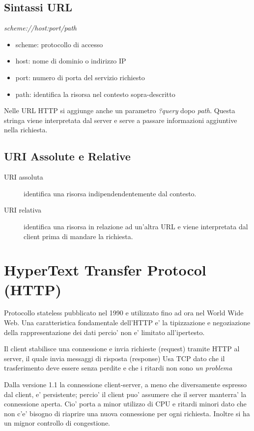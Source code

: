 \subsection{Sintassi URL}
\begin{center}
    \color{blue}\textit{scheme://host:port/path}
\end{center}
\begin{itemize}
    \item scheme: protocollo di accesso
    \item host: nome di dominio o indirizzo IP
    \item port: numero di porta del servizio richiesto
    \item path: identifica la risorsa nel contesto sopra-descritto
\end{itemize}
Nelle URL HTTP si aggiunge anche un parametro \textit{\color{blue}?query} dopo \textit{\color{blue}path}.
Questa stringa viene interpretata dal server e serve a passare informazioni aggiuntive nella richiesta.
\subsection{URI Assolute e Relative}
\begin{description}
    \item[URI assoluta] identifica una risorsa indipendendentemente dal contesto.
    \item[URI relativa] identifica una risorsa in relazione ad un'altra URL e viene interpretata dal client prima di mandare la richiesta. 
\end{description}
\section{HyperText Transfer Protocol (HTTP)}
Protocollo {\color{blue} stateless} pubblicato nel 1990 e utilizzato fino ad ora nel World Wide Web.
Una caratteristica fondamentale dell'HTTP e' la tipizzazione e negoziazione della rappresentazione dei dati percio' non e' limitato all'ipertesto.

Il client stabilisce una connessione e invia richieste ({\color{blue}request}) tramite HTTP al server, il quale invia messaggi di risposta ({\color{blue}response})
Usa TCP dato che il trasferimento deve essere senza perdite e che i ritardi non sono \textit{un problema}

Dalla versione 1.1 la connessione client-server, a meno che diversamente espresso dal client, e' persistente; percio' il client puo' assumere che il server manterra' la connessione aperta.
Cio' porta a minor utilizzo di CPU e ritardi minori dato che non c'e' bisogno di riaprire una nuova connessione per ogni richiesta.
Inoltre si ha un mignor controllo di congestione.

